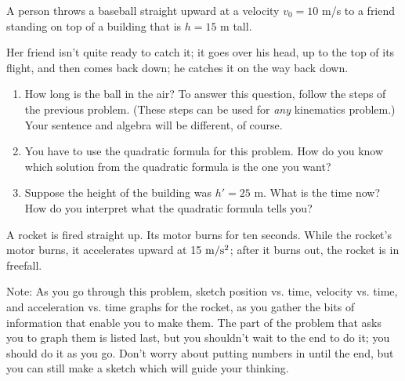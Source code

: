 \documentclass[12pt]{article}
\begin{document}
\newpage

A person throws a baseball straight upward at a velocity $v_0 = 10$ m/s
to a friend standing on top of a building that is $h=15$ m tall. 
 
Her friend isn't quite ready to catch it; it goes over his head, up to the 
top of its flight, and then comes back down; he catches it on the way back down.

\begin{enumerate}
\item
How long is the ball in the air? To answer this question, follow the steps
of the previous problem. (These steps can be used for {\it any} kinematics
problem.) Your sentence and algebra will be different, of course.

\item
You have to use the quadratic formula for this problem. How do you know
which solution from the quadratic formula is the one you want?

\item 
Suppose the height of the building was $h'=25$ m. What is the time now?
How do you interpret what the quadratic formula tells you?
\end{enumerate}

\newpage

A rocket is fired straight up. Its motor burns for ten seconds. While the rocket's motor burns, it
accelerates upward at 15 $\rm m/\rm s^2$; 
after it burns out, the rocket is in freefall.

Note: As you go through this problem, sketch position vs. time, velocity vs. time, and acceleration
vs. time graphs for the rocket, as you gather the bits of information that enable you to make
them. The part of the problem that asks you to graph them is listed last, but you shouldn't wait to
the end to do it; you should do it as you go. Don't worry about putting numbers
in until the end, but you can still make a sketch which will guide your thinking.
\end{document}
